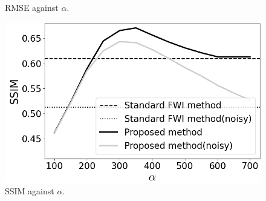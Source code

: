 \begin{figure}[htbp]
\begin{minipage}{58mm}
        \caption{RMSE against $\alpha$.}
        \label{fig:alpha-rmse}
        \vspace{-5mm}
    \end{minipage}
    \hspace{-2mm}
    \begin{minipage}{58mm}
        \centering
        \includegraphics[width=\linewidth]{public/alpha-ssim}
        \caption{SSIM against $\alpha$.}
        \label{fig:alpha-ssim}
        \vspace{-3mm}
    \end{minipage}
\end{figure}
